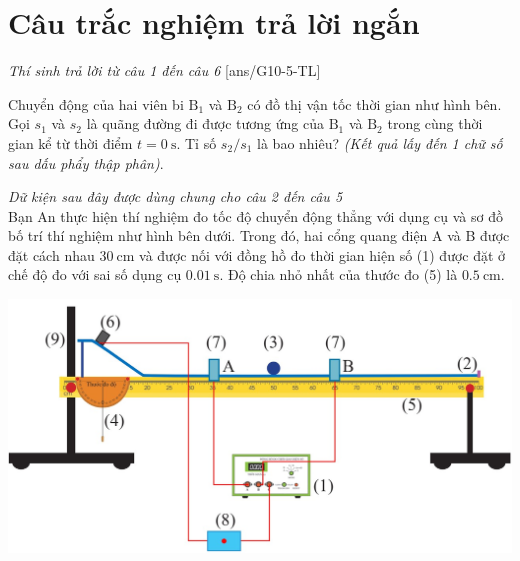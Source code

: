 \section{Câu trắc nghiệm trả lời ngắn} \textit{Thí sinh trả lời từ câu 1 đến câu 6}
\setcounter{ex}{0}
[ans/G10-5-TL]
\begin{ex}
	Chuyển động của hai viên bi $\mathrm{B}_1$ và $\mathrm{B}_2$ có đồ thị vận tốc thời gian như hình bên. Gọi $s_1$ và $s_2$ là quãng đường đi được tương ứng của $\mathrm{B}_1$ và $\mathrm{B}_2$ trong cùng thời gian kể từ thời điểm $t=\SI{0}{\second}$. Tỉ số $s_2/s_1$ là bao nhiêu? \textit{(Kết quả lấy đến 1 chữ số sau dấu phẩy thập phân)}.
	\begin{center}
	\end{center}
\end{ex}
\textit{Dữ kiện sau đây được dùng chung cho câu 2 đến câu 5}\\
Bạn An thực hiện thí nghiệm đo tốc độ chuyển động thẳng với dụng cụ và sơ đồ bố trí thí nghiệm như hình bên dưới.
Trong đó, hai cổng quang điện A và B được đặt cách nhau $\SI{30}{\centi\meter}$ và được nối với đồng hồ đo thời gian hiện số (1) được đặt ở chế độ đo với sai số dụng cụ $\SI{0.01}{\second}$. Độ chia nhỏ nhất của thước đo (5) là $\SI{0.5}{\centi\meter}$.
\begin{center}
	\includegraphics[width=0.75\linewidth]{../figs/D10-2-6}
\end{center}
